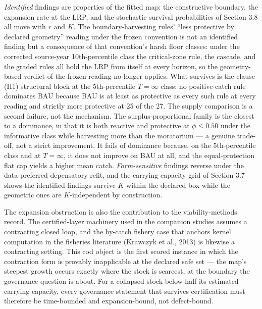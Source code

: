 \documentclass[11pt]{article}
\begin{document}
\emph{Identified} findings are properties of the fitted map: the
constructive boundary, the expansion rate at the LRP, and the stochastic
survival probabilities of Section 3.8 all move with \(r\) and \(K\). The
boundary-harvesting rules' ``less protective by declared geometry''
reading under the frozen convention is not an identified finding but a
consequence of that convention's harsh floor classes: under the
corrected source-year 10th-percentile class the critical-zone rule, the
cascade, and the graded rules all hold the LRP from itself at every
horizon, so the geometry-based verdict of the frozen reading no longer
applies. What survives is the clause-(H1) structural block at the
5th-percentile \(T=\infty\) class: no positive-catch rule dominates BAU
because BAU is at least as protective as every such rule at every
reading and strictly more protective at 25 of the 27. The supply
comparison is a second failure, not the
mechanism. The surplus-proportional family is the closest to a
dominance, in that it is both reactive and protective at
\(\phi \le 0.50\) under the informative class while harvesting more than
the moratorium --- a genuine trade-off, not a strict improvement. It
fails of dominance because, on the 5th-percentile class and at
\(T=\infty\), it does not improve on BAU at all, and the
equal-protection flat cap yields a higher mean catch.
\emph{Form-sensitive} findings reverse under the data-preferred
depensatory refit, and the carrying-capacity grid of Section 3.7 shows
the identified findings survive \(K\) within the declared box while the
geometric ones are \(K\)-independent by construction.

The expansion obstruction is also the contribution to the
viability-methods record. The certified-layer machinery used in the
companion studies assumes a contracting closed loop, and the by-catch
fishery case that anchors kernel computation in the fisheries literature
(Krawczyk et al., 2013) is likewise a contracting setting. This cod
object is the first scored instance in which the contraction form is
provably inapplicable at the declared safe set --- the map's steepest
growth occurs exactly where the stock is scarcest, at the boundary the
governance question is about. For a collapsed stock below half its
estimated carrying capacity, every governance statement that survives
certification must therefore be time-bounded and expansion-bound, not
defect-bound.
\end{document}
